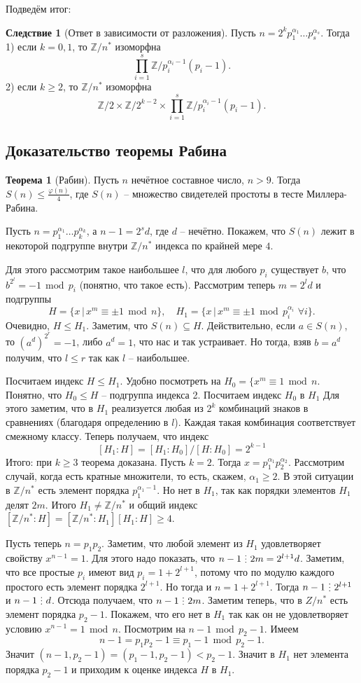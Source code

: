 \documentclass[10pt,a4paper,oneside]{book}
\theoremstyle{definition}
\newtheorem{thm}{\color{red!40!black}Теорема}
\newtheorem{cor}{\color{green!45!black}Следствие}
\renewcommand{\leq}{\leqslant}
\renewcommand{\geq}{\geqslant}
\renewcommand{\mod}{\,\operatorname{mod}\,}
\newcommand{\mb}[1]{\mathbb{#1}}
\newcommand{\di}{\mathop{\,\scalebox{0.85}{\raisebox{-1.2pt}[0.5\height]{\vdots}}\,}}
\def\thrm{\begin{thm}}
\def\ethrm{\end{thm}}
\def\crl{\begin{cor}}
\def\ecrl{\end{cor}}
\begin{document}
\endproof

Подведём итог: 

\crl[Ответ в зависимости от разложения] Пусть $n=2^kp_1^{\alpha_1}\dots p_s^{\alpha_s}$. Тогда\\
1) если $k = 0,1$, то  $\mb Z/n^*$ изоморфна $$\prod_{i=1}^s \mb Z/p_i^{\alpha_i-1}(p_i -1).$$
2) если $ k\geq 2$, то $\mb Z/n^*$ изоморфна $$\mb Z/2 \times \mb Z/2^{k-2} \times \prod_{i=1}^s \mb Z/p_i^{\alpha_i-1}(p_i -1).$$
\ecrl

\subsection{Доказательство теоремы Рабина}

\thrm[Рабин] Пусть $n$ нечётное составное число,  $n>9$. Тогда $S(n)\leq \frac{\varphi(n)}{4}$, где $S(n)$ -- множество свидетелей простоты в тесте Миллера-Рабина.
\ethrm
\proof Пусть $n=p_1^{\alpha_1}\dots p_k^{\alpha_k}$, а $n-1=2^sd$, где $d$ -- нечётно. Покажем, что $S(n)$ лежит в некоторой подгруппе внутри $\mb Z/n^*$ индекса по крайней мере $4$.

Для этого рассмотрим  такое наибольшее $l$, что для любого $p_i$ существует $b$, что $b^{2^l}=-1 \mod p_i$ (понятно, что такое есть). Рассмотрим теперь $m=2^ld$ и подгруппы $$H=\{ x\,|\, x^m\equiv \pm 1 \mod n\}, \quad H_1=\{ x\,|\, x^m \equiv \pm 1 \mod p_i^{\alpha_i} \,\,\forall i\}.$$
Очевидно, $H \leq H_1$. Заметим, что $S(n) \subseteq H$. Действительно, если $a\in S(n)$, то $(a^d)^{2^r}= -1$, либо $a^d=1$, что нас и так устраивает.  Но тогда, взяв $b=a^d$ получим, что $l\leq r$ так как $l$ -- наибольшее.

Посчитаем индекс $H \leq H_1$. Удобно посмотреть на $H_0= \{ x^m \equiv 1 \mod n$. Понятно, что $H_0 \leq H$ -- подгруппа индекса 2. Посчитаем индекс $H_0$ в $H_1$ Для этого заметим, что в $H_1$ реализуется любая из $2^k$ комбинаций знаков в сравнениях (благодаря определению в $l$). Каждая такая комбинация соответствует смежному классу. Теперь получаем, что индекс $$[H_1:H]=[H_1:H_0]/[H:H_0]=2^{k-1}$$
Итого: при $k\geq 3$ теорема доказана. Пусть $k=2$. Тогда $x=p_1^{\alpha_1}p_2^{\alpha_2}$. Рассмотрим случай, когда есть кратные множители, то есть, скажем, $\alpha_1\geq 2$. В этой ситуации в $\mb Z/n^*$ есть элемент порядка $p_1^{\alpha_1-1}$. Но нет в $H_1$, так как порядки элементов $H_1$ делят $2m$. Итого $H_1 \neq \mb Z/n^*$ и общий индекс $[\mb Z/n^*: H]=[\mb Z/n^*:H_1][H_1:H]\geq 4$.

Пусть теперь $n=p_1p_2$. Заметим, что любой элемент из $H_1$ удовлетворяет свойству $x^{n-1}=1$. Для этого надо показать, что $n-1 \di 2m=2^{l+1}d$. Заметим, что все простые $p_i$ имеют вид $p_i=1+2^{l+1}$, потому что по модулю каждого простого есть элемент порядка $2^{l+1}$. Но тогда и $n=1+2^{l+1}$. Тогда $n-1\di 2^{l+1}$ и $n-1\di d$. Отсюда получаем, что $n-1 \di 2m$. Заметим теперь, что в $Z/n^*$ есть элемент порядка $p_2-1$. Покажем, что его нет в $H_1$ так как он не удовлетворяет условию $x^{n-1}=1 \mod n$. Посмотрим на $n-1 \mod p_2-1$. Имеем $$n-1=p_1p_2-1\equiv p_1-1 \mod p_2-1.$$
Значит $(n-1,p_2-1)=(p_1-1,p_2-1)<p_2-1$. Значит в $H_1$ нет элемента порядка $p_2-1$ и приходим к оценке индекса $H$ в $H_1$.
\end{document}
